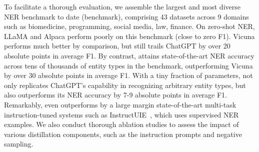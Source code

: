 To facilitate a thorough evaluation, we assemble the largest and most diverse NER benchmark to date (\longname benchmark), comprising 43 datasets across 9 domains such as biomedicine, programming, social media, law, finance.
On zero-shot NER, LLaMA and Alpaca perform poorly on this benchmark (close to zero F1). Vicuna performs much better by comparison, but still trails ChatGPT by over 20 absolute points in average F1. By contrast, \longname attains state-of-the-art NER accuracy across tens of thousands of entity types in the \longname benchmark, outperforming Vicuna by over 30 absolute points in average F1. 
With a tiny fraction of parameters, \longname not only replicates ChatGPT's capability in recognizing arbitrary entity types, but also outperforms its NER accuracy by 7-9 absolute points in average F1. 
Remarkably, \longname even outperforms by a large margin state-of-the-art multi-task instruction-tuned systems such as InstructUIE~\citep{wang2023instructuie}, which uses supervised NER examples.
We also conduct thorough ablation studies to assess the impact of various distillation components, such as the instruction prompts and negative sampling. 

